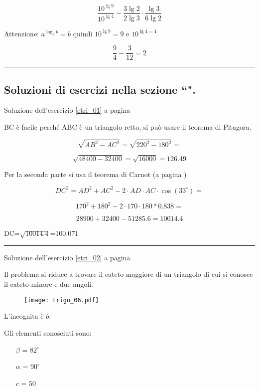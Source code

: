 \[
\frac{10^{\lg9}}{10^{\lg4}}-\frac{3\lg2}{2\lg3}\cdot\frac{\lg3}{6\lg2}
\]

Attenzione: $a^{\log_ab}=b$ quindi $10^{\lg9}=9$ e $10^{\lg4=4}$

\[
\frac{9}{4}-\frac{3}{12}=2
\]



\vspace{1cm}
\hrule
\vspace{1cm}

\subsection{Soluzioni di esercizi nella sezione ``\textbf{}".}



Soluzione dell'esercizio \ref{etri_01} a pagina \pageref{etri_01}\label{stri_01}

BC è facile perché ABC è un triangolo retto, si può usare il teorema di Pitagora.


\[
\sqrt{{AB}^2-{AC}^2}=
\sqrt{{220}^2-{180}^2}=
\]

\[
\sqrt{48400 - 32400}=\sqrt{16000}=126.49
\]

Per la seconda parte si usa il teorema di Carnot (a pagina \pageref{subs_carnot})

\[
DC^2=AD^2+AC^2-2\cdot AD\cdot AC\cdot \cos(33^\circ)=
\]

\[
170^2+180^2-2\cdot 170\cdot 180 * 0.838=
\]

\[
28900+32400-51285.6=10014.4
\]

DC=$\sqrt{10014.4}$=$100.071$

\vspace{1cm}
\hrule
\vspace{1cm}

Soluzione dell'esercizio \ref{etri_02} a pagina \pageref{etri_02}\label{stri_02}

Il problema si riduce a trovare il cateto maggiore di un triangolo di cui si conosce il cateto minore e due angoli.

\begin{figure}[H]
\centering
\texttt{[image: trigo\_06.pdf]}
\end{figure}

L'incognita è $b$.

Gli elementi conosciuti sono:
\begin{itemize}
\item[$\beta$] = $82^{\circ}$
\item[$\alpha$] = $90^{\circ}$
\item[$c$] = $50$
\end{itemize}

